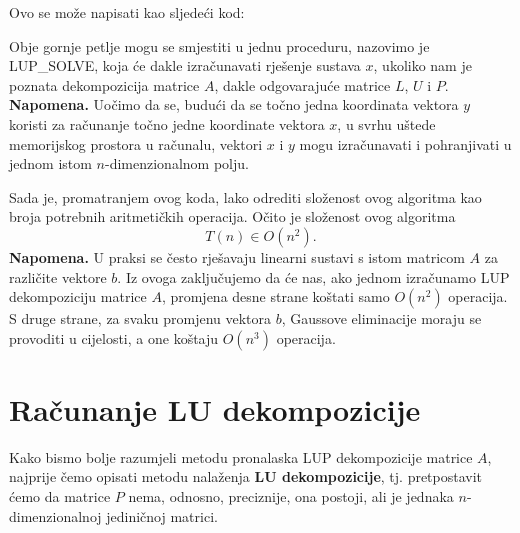 \documentclass[a4paper,12pt,oneside]{article}
\begin{document}
\noindent Ovo se može napisati kao sljedeći kod:


\noindent Obje gornje petlje mogu se smjestiti u jednu proceduru, nazovimo je LUP\_SOLVE, koja će dakle izračunavati rješenje sustava $x$, ukoliko nam je poznata dekompozicija matrice $A$, dakle odgovarajuće matrice $L$, $U$ i $P$.\newline
\newline \textbf{Napomena.} Uočimo da se, budući da se točno jedna koordinata vektora $y$ koristi za računanje točno jedne koordinate vektora $x$, u svrhu uštede memorijskog prostora u računalu, vektori $x$ i $y$ mogu izračunavati i pohranjivati u jednom istom $n$-dimenzionalnom polju.



\noindent Sada je, promatranjem ovog koda, lako odrediti složenost ovog algoritma kao broja potrebnih aritmetičkih operacija.\newline 
\noindent Očito je složenost ovog algoritma
$$T(n)\in O(n^2).$$
\noindent \textbf{Napomena.} U praksi se često rješavaju linearni sustavi s istom matricom $A$ za različite vektore $b$. Iz ovoga zaključujemo da će nas, ako jednom izračunamo LUP dekompoziciju matrice $A$, promjena desne strane koštati samo $O(n^2)$ operacija. S druge strane, za svaku promjenu vektora $b$, Gaussove eliminacije moraju se provoditi u cijelosti, a one koštaju $O(n^3)$ operacija.
\section*{Računanje LU dekompozicije}
Kako bismo bolje razumjeli metodu pronalaska LUP dekompozicije matrice $A$, najprije čemo opisati metodu nalaženja \textbf{LU dekompozicije}, tj. pretpostavit ćemo da matrice $P$ nema, odnosno, preciznije, ona postoji, ali je jednaka $n$-dimenzionalnoj  jediničnoj matrici.\newline
\end{document}
